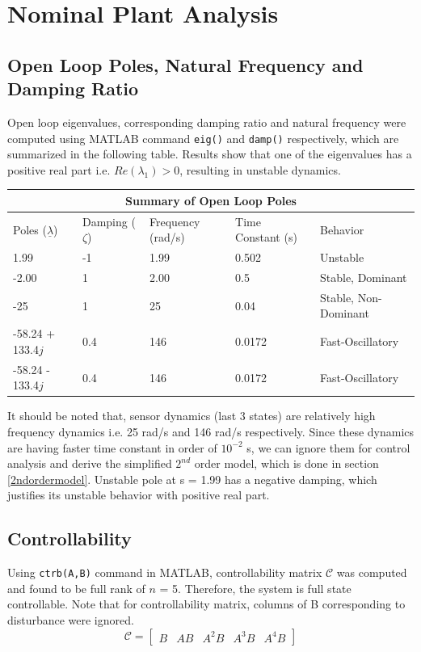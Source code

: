 \documentclass[12pt]{article}
\begin{document}
	\section{Nominal Plant Analysis}
	\subsection{Open Loop Poles, Natural Frequency and Damping Ratio}
	Open loop eigenvalues, corresponding damping ratio and natural frequency were computed using MATLAB command \texttt{eig()} and \texttt{damp()} respectively, which are summarized in the following table. Results show that one of the eigenvalues has a positive real part i.e. $Re(\lambda_1) > 0$, resulting in unstable dynamics.  
	\begin{center}
		\begin{tabular}{ |p{2.8cm}|p{2.0cm}|p{2cm}|p{2.7cm}||p{4.2cm}| }
			\hline
			\multicolumn{5}{|c|}{Summary of Open Loop Poles} \\
			\hline
			Poles ($\underline{\lambda}$)  & Damping ($\zeta$) & Frequency (rad/s) & Time Constant (s) & Behavior\\
			\hline
			1.99 & -1 & 1.99 & 0.502 & Unstable\\
			-2.00 & 1 & 2.00 & 0.5 & Stable, Dominant\\
			-25 & 1 & 25 & 0.04 & Stable, Non-Dominant\\
			-58.24 + 133.4$j$ & 0.4 & 146 & 0.0172 & Fast-Oscillatory\\
			-58.24 - 133.4$j$ & 0.4 & 146 & 0.0172 & Fast-Oscillatory\\
			\hline
		\end{tabular}
	\end{center}
	
	It should be noted that, sensor dynamics (last 3 states) are relatively high frequency dynamics i.e. 25 rad/s and 146 rad/s respectively. Since these dynamics are having faster time constant in order of $10^{-2}$ s, we can ignore them for control analysis and derive the simplified $2^{nd}$ order model, which is done in section \ref{2ndordermodel}. Unstable pole at s = 1.99 has a negative damping, which justifies its unstable behavior with positive real part. 
	
	\subsection{Controllability}
	Using \texttt{ctrb(A,B)} command in MATLAB, controllability matrix $\mathcal{C}$ was computed and found to be full rank of $n$ = 5. Therefore, the system is full state controllable. Note that for controllability matrix, columns of B corresponding to disturbance were ignored. 
	\begin{equation}
	\mathcal{C}= \begin{bmatrix}
	B & AB & A^2B & A^3B & A^4B
	\end{bmatrix}
	\end{equation}
	
\end{document}
